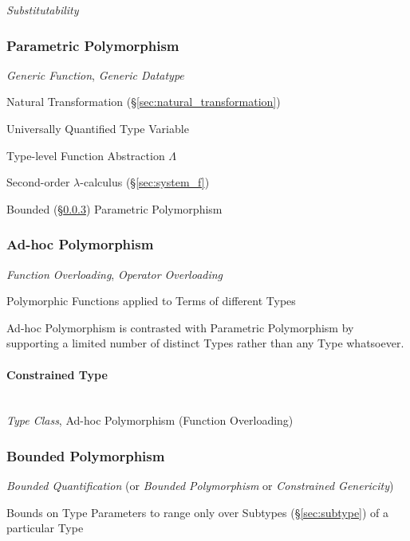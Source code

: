 \emph{Substitutability}



\subsubsection{Parametric Polymorphism}
\label{sec:parametric_polymorphism}

\emph{Generic Function}, \emph{Generic Datatype}

Natural Transformation (\S\ref{sec:natural_transformation})

Universally Quantified Type Variable

Type-level Function Abstraction $\Lambda$

Second-order $\lambda$-calculus (\S\ref{sec:system_f})

Bounded (\S\ref{sec:bounded_polymorphism}) Parametric Polymorphism



\subsubsection{Ad-hoc Polymorphism}\label{sec:adhoc_polymorphism}

\emph{Function Overloading}, \emph{Operator Overloading}

Polymorphic Functions applied to Terms of different Types

Ad-hoc Polymorphism is contrasted with Parametric Polymorphism by
supporting a limited number of distinct Types rather than any Type
whatsoever.



\paragraph{Constrained Type}\label{sec:constrained_type}
\hfill \\

\emph{Type Class}, Ad-hoc Polymorphism (Function Overloading)



\subsubsection{Bounded Polymorphism}\label{sec:bounded_polymorphism}

\emph{Bounded Quantification} (or \emph{Bounded Polymorphism} or
\emph{Constrained Genericity})

Bounds on Type Parameters to range only over Subtypes
(\S\ref{sec:subtype}) of a particular Type


